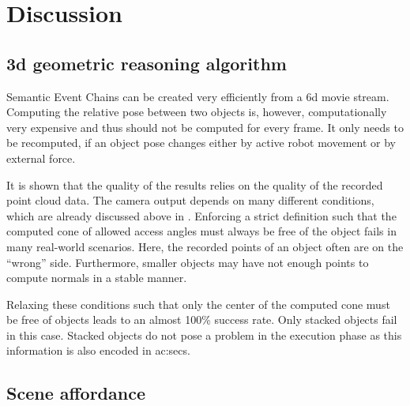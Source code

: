 \section{Discussion}
\label{sec:action_discussion}





\subsection{3d geometric reasoning algorithm}

Semantic Event Chains can be created very efficiently from a 6d movie stream.
Computing the relative pose between two objects is, however, computationally very expensive and thus should not be computed for every frame.
It only needs to be recomputed, if an object pose changes either by active robot movement or by external force.

It is shown that the quality of the results relies on the quality of the recorded point cloud data.
The camera output depends on many different conditions, which are already discussed above in .
Enforcing a strict definition such that the computed cone of allowed access angles must always be free of the object fails in many real-world scenarios.
Here, the recorded points of an object often are on the ``wrong'' side.
Furthermore, smaller objects may have not enough points to compute normals in a stable manner.

Relaxing these conditions such that only the center of the computed cone must be free of objects leads to an almost 100\% success rate.
Only stacked objects fail in this case.
Stacked objects do not pose a problem in the execution phase as this information is also encoded in \glspl{ac:sec}.





\subsection{Scene affordance}

